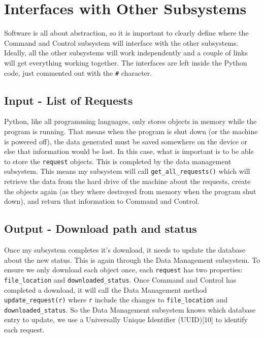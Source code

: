 \documentclass{article}
\begin{document}
\section{Interfaces with Other Subsystems}

Software is all about abstraction, so it is important to clearly
define where the Command and Control subsystem will interface with the other
subsystems. Ideally, all the other subsystems will work independently
and a couple of links will get everything working together. The
interfaces are left inside the Python code, just commented out with
the \texttt{\#} character.

\subsection{Input - List of Requests}

Python, like all programming languages, only stores objects in memory while the program is
running. That means when the program is shut down (or the machine is
powered off), the data generated must be saved somewhere on the
device or else that information would be lost. In this case, what is
important is to be able to store the \texttt{request} objects. This is
completed by the data management subsystem. This means my subsystem
will call \texttt{get\_all\_requests()} which will retrieve the data
from the hard drive of the machine
about the requests, create the objects again (as they where destroyed
from memory when the program shut down), and return that information
to Command and Control.

\subsection{Output - Download path and status}

Once my subsystem completes it's download, it needs to update the
database about the new status. This is again through the Data
Management subsystem. To ensure we only download each object once, each
\texttt{request} has two properties: \texttt{file\_location} and
\texttt{downloaded\_status}. Once Command and Control has completed a
download, it will call the Data Management method
\texttt{update\_request(r)} where \texttt{r} include the changes to
\texttt{file\_location} and \texttt{downloaded\_status}. So the
Data Management subsystem knows which database entry to update, we use
a Universally Unique Identifier (UUID)[10] to identify each
request.
\end{document}
